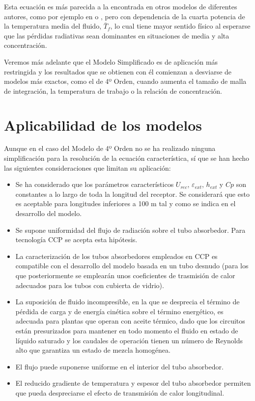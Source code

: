 Esta ecuación es más parecida a la encontrada en otros modelos de diferentes autores, como por ejemplo en \cite{hottelEvaluationFlatplateSolar1955} o \cite{fraidenraichImprovedSolutionsTemperature1997a}, pero con dependencia de la cuarta potencia de la temperatura media del fluido, $\bar{T}_{f}$, lo cual tiene mayor sentido físico al esperarse que las pérdidas radiativas sean dominantes en situaciones de media y alta concentración.

Veremos más adelante que el Modelo Simplificado es de aplicación más restringida y los resultados que se obtienen con él comienzan a desviarse de modelos más exactos, como el de 4º Orden, cuando aumenta el tamaño de malla de integración, la temperatura de trabajo o la relación de concentración.

\section{Aplicabilidad de los modelos}
Aunque en el caso del Modelo de 4º Orden no se ha realizado ninguna simplificación para la resolución de la ecuación característica, sí que se han hecho las siguientes consideraciones que limitan su aplicación: 

\begin{itemize}
\item
Se ha considerado que los parámetros característicos \(U_{rec}\), \(\varepsilon_{ext}\), \(h_{ext}\) y \(Cp\) son constantes a lo largo de toda la longitud del receptor. Se considerará que esto es aceptable para longitudes inferiores a 100 m tal y como se indica en el desarrollo del modelo. 
\item Se supone uniformidad del flujo de radiación sobre el tubo absorbedor. Para tecnología CCP se acepta esta hipótesis. 
\item La caracterización de los tubos absorbedores empleados en CCP es compatible con el desarrollo del modelo basada en un tubo desnudo (para los que posteriormente se emplearán unos coeficientes de trasmisión de calor adecuados para los tubos con cubierta de vidrio). 
\item La suposición de fluido incompresible, en la que se desprecia el término de pérdida de carga y de energía cinética sobre el término energético, es adecuada para plantas que operan con aceite térmico,  dado que los circuitos están presurizados para mantener en todo momento el fluido en estado de líquido saturado y los caudales de operación tienen un número de Reynolds alto que garantiza un estado de mezcla homogénea. 
\item El flujo puede suponerse uniforme en el interior del tubo absorbedor. 
\item El reducido gradiente de temperatura y espesor del tubo absorbedor permiten que pueda despreciarse el efecto de transmisión de calor longitudinal. 
\end{itemize}

